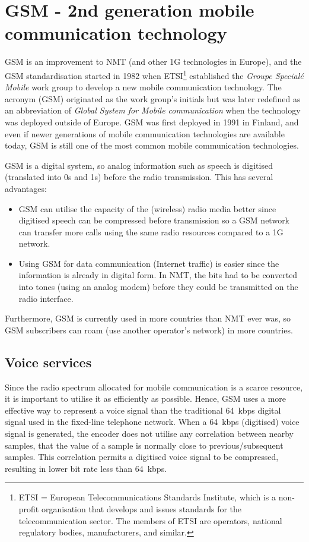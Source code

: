 \section{\texorpdfstring{GSM - 2nd generation mobile communication technology}{GSM - 2nd generation mobile communication technology}}
GSM is an improvement to NMT (and other 1G technologies in Europe), and the GSM standardisation started in 1982 when ETSI\footnote{ETSI = European Telecommunications Standards Institute, which is a non-profit organisation that develops and issues standards for the telecommunication sector. The members of ETSI are operators, national regulatory bodies, manufacturers, and similar.} established the \emph{Groupe Special\'{e} Mobile} work group to develop a new mobile communication technology. The acronym (GSM) originated as the work group's initials but was later redefined as an abbreviation of \emph{Global System for Mobile communication} when the technology was deployed outside of Europe. GSM was first deployed in 1991 in Finland, and even if newer generations of mobile communication technologies are available today, GSM is still one of the most common mobile communication technologies.

GSM is a digital system, so analog information such as speech is digitised (translated into 0s and 1s) before the radio transmission. This has several advantages:
\begin{itemize}
%
\item GSM can utilise the capacity of the (wireless) radio media better since digitised speech can be compressed before transmission so a GSM network can transfer more calls using the same radio resources compared to a 1G network.
%
\item Using GSM for data communication  (\ie Internet traffic) is easier since the information is already in digital form. In NMT, the bits had to be converted into tones (using an analog modem) before they could be transmitted on the radio interface.
%
\end{itemize}

Furthermore, GSM is currently used in more countries than NMT ever was, so GSM subscribers can roam (use another operator's network) in more countries.

\subsection{Voice services}\label{sec:voice_services}\label{sec:gsm_voice_services}
Since the radio spectrum allocated for mobile communication is a scarce resource, it is important to utilise it as efficiently as possible. Hence, GSM uses a more effective way to represent a voice signal than the traditional 64~kbps digital signal used in the fixed-line telephone network. When a 64~kbps (digitised) voice signal is generated, the encoder does not utilise any correlation between nearby samples, \ie that the value of a sample is normally close to previous/subsequent samples. This correlation permits a digitised voice signal to be compressed, resulting in lower bit rate less than 64~kbps.

